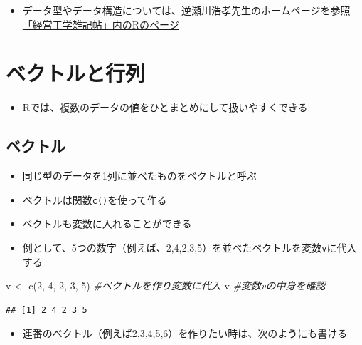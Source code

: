 \documentclass[
]{book}
\newenvironment{Shaded}{\begin{snugshade}}{\end{snugshade}}
\newcommand{\CommentTok}[1]{\textcolor[rgb]{0.56,0.35,0.01}{\textit{#1}}}
\newcommand{\DecValTok}[1]{\textcolor[rgb]{0.00,0.00,0.81}{#1}}
\newcommand{\FunctionTok}[1]{\textcolor[rgb]{0.00,0.00,0.00}{#1}}
\newcommand{\NormalTok}[1]{#1}
\newcommand{\OtherTok}[1]{\textcolor[rgb]{0.56,0.35,0.01}{#1}}
\providecommand{\tightlist}{%
  \setlength{\itemsep}{0pt}\setlength{\parskip}{0pt}}
\begin{document}
\begin{itemize}
\tightlist
\item
  データ型やデータ構造については、逆瀬川浩孝先生のホームページを参照\\
  \href{http://www.f.waseda.jp/sakas/R/index.html}{「経営工学雑記帖」内のRのページ}
\end{itemize}

\hypertarget{ux30d9ux30afux30c8ux30ebux3068ux884cux5217}{%
\section{ベクトルと行列}\label{ux30d9ux30afux30c8ux30ebux3068ux884cux5217}}

\begin{itemize}
\tightlist
\item
  Rでは、複数のデータの値をひとまとめにして扱いやすくできる
\end{itemize}

\hypertarget{ux30d9ux30afux30c8ux30eb}{%
\subsection{ベクトル}\label{ux30d9ux30afux30c8ux30eb}}

\begin{itemize}
\tightlist
\item
  同じ型のデータを1列に並べたものをベクトルと呼ぶ
\item
  ベクトルは関数\texttt{c()}を使って作る
\item
  ベクトルも変数に入れることができる
\item
  例として、5つの数字（例えば、2,4,2,3,5）を並べたベクトルを変数\texttt{v}に代入する
\end{itemize}

\begin{Shaded}
\begin{Highlighting}[]
\NormalTok{v }\OtherTok{\textless{}{-}} \FunctionTok{c}\NormalTok{(}\DecValTok{2}\NormalTok{, }\DecValTok{4}\NormalTok{, }\DecValTok{2}\NormalTok{, }\DecValTok{3}\NormalTok{, }\DecValTok{5}\NormalTok{) }\CommentTok{\#ベクトルを作り変数に代入}
\NormalTok{v }\CommentTok{\#変数vの中身を確認}
\end{Highlighting}
\end{Shaded}

\begin{verbatim}
## [1] 2 4 2 3 5
\end{verbatim}

\begin{itemize}
\tightlist
\item
  連番のベクトル（例えば2,3,4,5,6）を作りたい時は、次のようにも書ける
\end{itemize}
\end{document}
